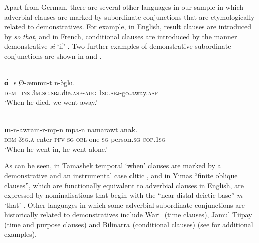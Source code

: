 \documentclass[output=paper,colorlinks,citecolor=brown]{langscibook}
\begin{document}
Apart from German, there are several other languages in our sample in which adverbial clauses are marked by subordinate conjunctions that are etymologically related to demonstratives. For example, in English, result clauses are introduced by \textit{so} \textit{that}, and in French, conditional clauses are introduced by the manner demonstrative \textit{si} ‘if’ \citep{König2012}. Two further examples of demonstrative subordinate conjunctions are shown in  and .

\ea\label{ex:diessel:34}
\\
\gll {\ob}\textbf{\`ɑ}=s   Ø-æmmu-t{\cb}     n-\`əglɑ.\\
     {\db}\textsc{dem=ins}   \textsc{3m.sg.sbj.}die.\textsc{asp-aug}   \textsc{1sg.sbj-}go.away.\textsc{asp}\\
\glt ‘When he died, we went away.’
\z

\ea\label{ex:diessel:35}
\\
\gll {\ob}\textbf{m}-n-awram-r-mp-n{\cb}     mpa-n  namarawt  anak.\\
     {\db}\textsc{dem}-\textsc{3sg.a}-enter-\textsc{pfv-sg-obl}   one-\textsc{sg}  person.\textsc{sg}  \textsc{cop.1sg}\\
\glt ‘When he went in, he went alone.’
\z

As can be seen, in Tamashek temporal ‘when’ clauses are marked by a demonstrative and an instrumental case clitic \citep[663]{Heath2005}, and in Yimas “finite oblique clauses”, which are functionally equivalent to adverbial clauses in English, are expressed by nominalisations that begin with the “near distal deictic base” \textit{m-} ‘that’ \citep[435]{Foley1991}. Other languages in which some adverbial subordinate conjunctions are historically related to demonstratives include Wariˈ (time clauses), Jamul Tiipay (time and purpose clauses) and Bilinarra (conditional clauses) (see \citealt[250-251]{HeineKuteva2007} for additional examples).
\end{document}
